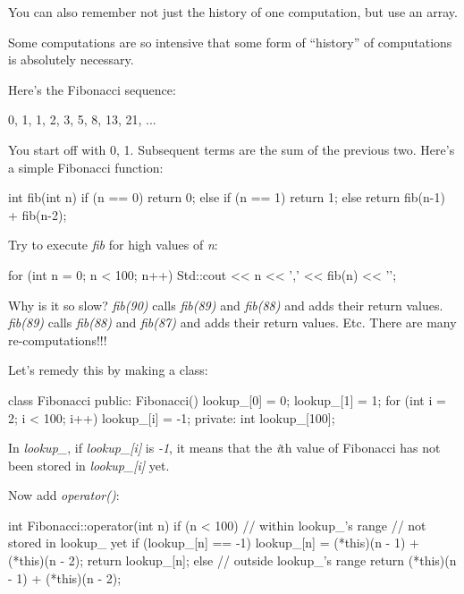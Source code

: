 You can also remember not just the history of one computation, but use
an array.

Some computations are so intensive that some form of ``history'' of
computations is absolutely necessary.

Here's the Fibonacci sequence:

0, 1, 1, 2, 3, 5, 8, 13, 21, ...

You start off with 0, 1. Subsequent terms are the sum of the previous
two. Here's a simple Fibonacci function:

\begin{consolethree}[escapeinside=||]
int fib(int n)
{
    if (n == 0)
        return 0;
    else if (n == 1)
        return 1;
    else
        return fib(n-1) + fib(n-2);
}
\end{consolethree}

Try to execute \textit{fib} for high values of \textit{n}:

\begin{consolethree}[escapeinside=||]
for (int n = 0; n < 100; n++)
{
    Std::cout << n << ',' << fib(n) << '\n';
}
\end{consolethree}

Why is it so slow? \textit{fib(90)} calls \textit{fib(89)} and
\textit{fib(88)} and adds their return values. \textit{fib(89)} calls
\textit{fib(88)} and \textit{fib(87)} and adds their return values. Etc.
There are many re-computations!!!

Let's remedy this by making a class:

\begin{consolethree}[escapeinside=||]
class Fibonacci
{
public:
    Fibonacci()
    {
        lookup_[0] = 0;
        lookup_[1] = 1;
        for (int i = 2; i < 100; i++)
        {
            lookup_[i] = -1;
        }
    }
private:
    int lookup_[100];
}
\end{consolethree}

In \textit{lookup\_}, if \textit{lookup\_[i]} is \textit{-1}, it means
that the \textit{i}th value of Fibonacci has not been stored in
\textit{lookup\_[i]} yet.

Now add \textit{operator()}:

\begin{consolethree}[escapeinside=||]
int Fibonacci::operator(int n)
{
    if (n < 100) // within lookup_'s range
    {
        // not stored in lookup_ yet
        if (lookup_[n] == -1)
            lookup_[n] = (*this)(n - 1) + (*this)(n - 2);
        return lookup_[n];
    }
    else // outside lookup_'s range
    {
        return (*this)(n - 1) + (*this)(n - 2);
    }
}
\end{consolethree}

